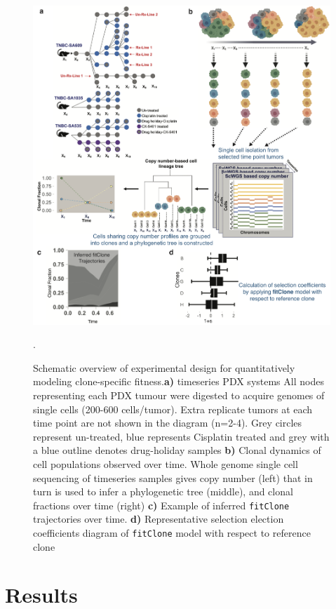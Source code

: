 \begin{figure}
\centering
\includegraphics[width=\textwidth]{Figures/chap4/fig1thesischap4.png}
\caption{Schematic overview of experimental design for quantitatively modeling clone-specific fitness.\textbf{a)} timeseries PDX systems All nodes representing each PDX tumour were digested to acquire genomes of single cells (200-600 cells/tumor). Extra replicate tumors at each time point are not shown in the diagram (n=2-4). Grey circles represent un-treated, blue represents Cisplatin treated and grey with a blue outline denotes drug-holiday samples \textbf{b)} Clonal dynamics of cell populations observed over time. Whole genome single cell sequencing of timeseries samples gives copy number (left) that in turn is used to infer a phylogenetic tree (middle), and clonal fractions over time (right) \textbf{c)} Example of inferred \texttt{fitClone} trajectories over time. \textbf{d)} Representative selection election coefficients diagram of \texttt{fitClone} model with respect to reference clone}.
\label{fig:schematic}
\end{figure}



\section{Results}

